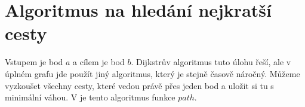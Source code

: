 \section{Algoritmus na hledání nejkratší cesty}
\label{sec:adaptace}
  Vstupem je bod $a$ a cílem je bod $b$. Dijkstrův algoritmus tuto úlohu řeší, ale v úplném grafu jde použít jiný algoritmus, který je stejně časově náročný. Můžeme vyzkoušet všechny cesty, které vedou právě přes jeden bod a uložit si tu s minimální váhou. V  je tento algoritmus funkce $path$.